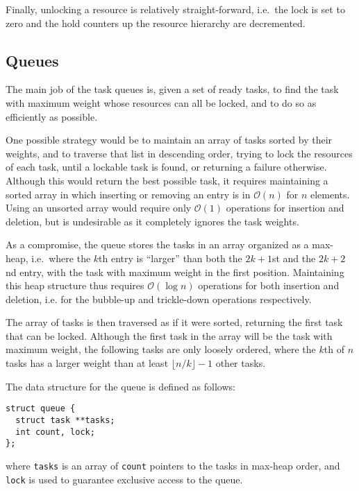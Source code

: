 \documentclass[preprint]{elsarticle}
\newcommand{\oh}[1]
    {\mbox{$ {\mathcal O}( #1 ) $}}
\begin{document}
Finally, unlocking a resource is relatively straight-forward,
i.e.~the lock is set to zero and the hold counters up the
resource hierarchy are decremented.


\subsection{Queues}

The main job of the task queues is, given a set of ready tasks,
to find the task with maximum weight whose resources can all
be locked, and to do so as efficiently as possible.

One possible strategy would be to maintain an array of tasks
sorted by their weights, and to traverse that list in descending
order, trying to lock the resources of each task, until
a lockable task is found, or returning a failure otherwise.
Although this would return the best possible task, it
requires maintaining a sorted array in which inserting
or removing an entry is in \oh{n} for $n$ elements.
Using an unsorted array would require only \oh{1} operations for
insertion and deletion, but is undesirable as it completely
ignores the task weights.

As a compromise, the queue stores the tasks in an array
organized as a max-heap, i.e.~where the $k$th entry is ``larger''
than both the $2k+1$st and the $2k+2$nd entry,
with the task with maximum weight
in the first position.
Maintaining this heap structure thus requires \oh{\log n}
operations for both insertion and deletion, i.e. for the
bubble-up and trickle-down operations respectively.

The array of tasks is then traversed as if it were sorted,
returning the first task that can be locked.
Although the first task in the array will be the task with
maximum weight, the following tasks are only loosely ordered,
where the $k$th of $n$ tasks has a larger weight than at least
$\lfloor n/k\rfloor -1$ other tasks.

The data structure for the queue is defined as follows:
\begin{center}\begin{minipage}{0.9\textwidth}
    \begin{lstlisting}
struct queue {
  struct task **tasks;
  int count, lock;
};
    \end{lstlisting}
\end{minipage}\end{center}
\noindent where {\tt tasks} is an array of {\tt count} pointers
to the tasks in max-heap order, and {\tt lock} is used to
guarantee exclusive access to the queue.
\end{document}
